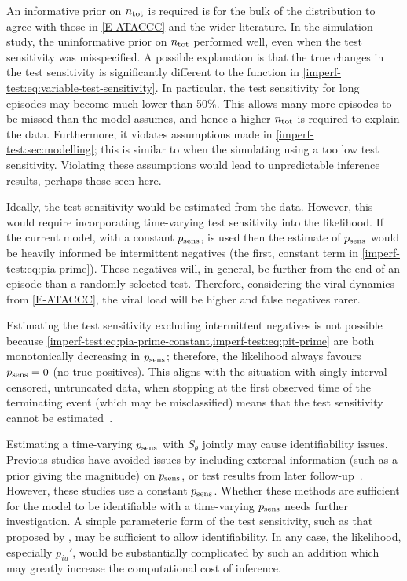 \documentclass[thesis.tex]{subfiles}
\begin{document}
An informative prior on $n_\text{tot}$ is required is for the bulk of the distribution to agree with those in \cref{E-ATACCC} and the wider literature.
In the simulation study, the uninformative prior on $n_\text{tot}$ performed well, even when the test sensitivity was misspecified.
A possible explanation is that the true changes in the test sensitivity is significantly different to the function in \cref{imperf-test:eq:variable-test-sensitivity}.
In particular, the test sensitivity for long episodes may become much lower than 50\%.
This allows many more episodes to be missed than the model assumes, and hence a higher $n_\text{tot}$ is required to explain the data.
Furthermore, it violates assumptions made in \cref{imperf-test:sec:modelling}; this is similar to when the simulating using a too low test sensitivity.
Violating these assumptions would lead to unpredictable inference results, perhaps those seen here.

Ideally, the test sensitivity would be estimated from the data.
However, this would require incorporating time-varying test sensitivity into the likelihood.
If the current model, with a constant $p_\text{sens}$, is used then the estimate of $p_\text{sens}$ would be heavily informed be intermittent negatives (the first, constant term in \cref{imperf-test:eq:pia-prime}).
These negatives will, in general, be further from the end of an episode than a randomly selected test.
Therefore, considering the viral dynamics from \cref{E-ATACCC}, the viral load will be higher and false negatives rarer.

Estimating the test sensitivity excluding intermittent negatives is not possible because \cref{imperf-test:eq:pia-prime-constant,imperf-test:eq:pit-prime} are both monotonically decreasing in $p_\text{sens}$; therefore, the likelihood always favours $p_\text{sens} = 0$ (\ie no true positives).
This aligns with the situation with singly interval-censored, untruncated data, when stopping at the first observed time of the terminating event (which may be misclassified) means that the test sensitivity cannot be estimated~\autocite[e.g.]{titmanMisclassify}.

Estimating a time-varying $p_\text{sens}$ with $S_\theta$ jointly may cause identifiability issues.
Previous studies have avoided issues by including external information (such as a prior giving the magnitude) on $p_\text{sens}$, or test results from later follow-up~\autocite[and references therein]{piresIntervalMisclassify}.
However, these studies use a constant $p_\text{sens}$.
Whether these methods are sufficient for the model to be identifiable with a time-varying $p_\text{sens}$ needs further investigation.
A simple parameteric form of the test sensitivity, such as that proposed by \textcite{brownBayesian}, may be sufficient to allow identifiability.
In any case, the likelihood, especially $p_{iu}'$, would be substantially complicated by such an addition which may greatly increase the computational cost of inference.
\end{document}

